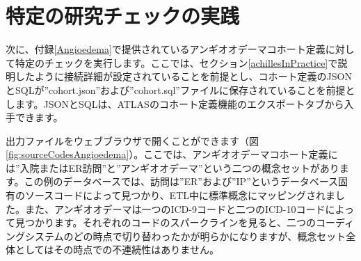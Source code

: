 \documentclass[
  11pt]{book}
\newenvironment{Shaded}{\begin{snugshade}}{\end{snugshade}}
\newcommand{\AttributeTok}[1]{\textcolor[rgb]{0.13,0.29,0.53}{#1}}
\newcommand{\FunctionTok}[1]{\textcolor[rgb]{0.13,0.29,0.53}{\textbf{#1}}}
\newcommand{\NormalTok}[1]{#1}
\newcommand{\OtherTok}[1]{\textcolor[rgb]{0.56,0.35,0.01}{#1}}
\newcommand{\SpecialCharTok}[1]{\textcolor[rgb]{0.81,0.36,0.00}{\textbf{#1}}}
\newcommand{\StringTok}[1]{\textcolor[rgb]{0.31,0.60,0.02}{#1}}
\theoremstyle{definition}
\theoremstyle{definition}
\theoremstyle{definition}
\theoremstyle{definition}
\theoremstyle{remark}
\begin{document}
\section{特定の研究チェックの実践}\label{ux7279ux5b9aux306eux7814ux7a76ux30c1ux30a7ux30c3ux30afux306eux5b9fux8df5}

次に、付録\ref{Angioedema}で提供されているアンギオオデーマコホート定義に対して特定のチェックを実行します。ここでは、セクション\ref{achillesInPractice}で説明したように接続詳細が設定されていることを前提とし、コホート定義のJSONとSQLが''cohort.json''および''cohort.sql''ファイルに保存されていることを前提とします。JSONとSQLは、ATLASのコホート定義機能のエクスポートタブから入手できます。

\begin{Shaded}
\end{Shaded}

出力ファイルをウェブブラウザで開くことができます（図\ref{fig:sourceCodesAngioedema}）。ここでは、アンギオオデーマコホート定義には''入院またはER訪問''と''アンギオオデーマ''という二つの概念セットがあります。この例のデータベースでは、訪問は''ER''および''IP''というデータベース固有のソースコードによって見つかり、ETL中に標準概念にマッピングされました。また、アンギオオデーマは一つのICD-9コードと二つのICD-10コードによって見つかります。それぞれのコードのスパークラインを見ると、二つのコーディングシステムのどの時点で切り替わったかが明らかになりますが、概念セット全体としてはその時点での不連続性はありません。
\end{document}
